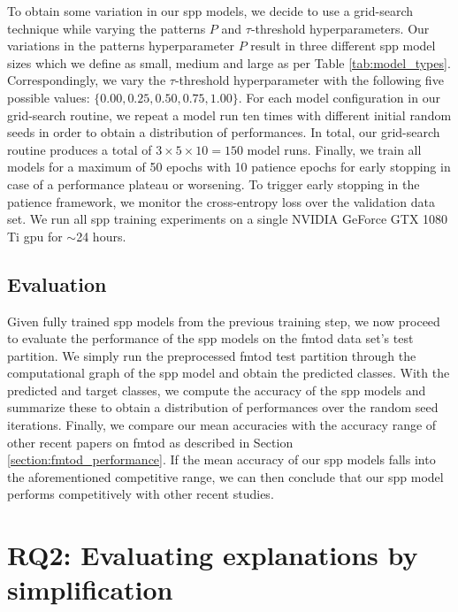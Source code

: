 To obtain some variation in our \ac{spp} models, we decide to use a grid-search
technique while varying the patterns $P$ and $\tau$-threshold hyperparameters.
Our variations in the patterns hyperparameter $P$ result in three different
\ac{spp} model sizes which we define as small, medium and large as per Table
\ref{tab:model_types}. Correspondingly, we vary the $\tau$-threshold
hyperparameter with the following five possible values: $\{0.00, 0.25, 0.50,
0.75, 1.00\}$. For each model configuration in our grid-search routine, we
repeat a model run ten times with different initial random seeds in order to
obtain a distribution of performances. In total, our grid-search routine
produces a total of $3\times5\times10=150$ model runs. Finally, we train all
models for a maximum of 50 epochs with 10 patience epochs for early stopping in
case of a performance plateau or worsening. To trigger early stopping in the
patience framework, we monitor the cross-entropy loss over the validation data
set. We run all \ac{spp} training experiments on a single NVIDIA GeForce GTX 1080
Ti \ac{gpu} for $\sim$24 hours.

\subsection{Evaluation}

Given fully trained \ac{spp} models from the previous training step, we now
proceed to evaluate the performance of the \ac{spp} models on the \ac{fmtod} data set's
test partition. We simply run the preprocessed \ac{fmtod} test partition through the
computational graph of the \ac{spp} model and obtain the predicted classes. With
the predicted and target classes, we compute the accuracy of the \ac{spp} models
and summarize these to obtain a distribution of performances over the random
seed iterations. Finally, we compare our mean accuracies with the accuracy range
of other recent papers on \ac{fmtod} as described in Section
\ref{section:fmtod_performance}. If the mean accuracy of our \ac{spp} models
falls into the aforementioned competitive range, we can then conclude that our
\ac{spp} model performs competitively with other recent studies.

\section{RQ2: Evaluating explanations by simplification}

\label{section:evaluate_explain}

